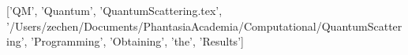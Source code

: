 ['QM', 'Quantum', 'QuantumScattering.tex', '/Users/zechen/Documents/PhantasiaAcademia/Computational/QuantumScattering', 'Programming', 'Obtaining', 'the', 'Results']

